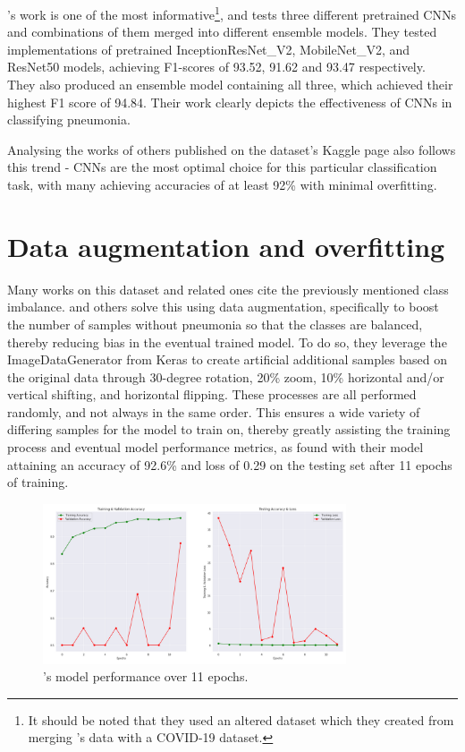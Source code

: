 \documentclass[12pt]{report}
\newcommand{\para}{\vspace{7pt}\noindent}
\begin{document}
\para \textcite{elasnaouiDesignEnsembleDeep2021a}'s work is one of the most informative\footnote{It should be noted that they used an altered dataset which they created from merging \textcite{kermanyIdentifyingMedicalDiagnoses2018}'s data with a COVID-19 dataset.},
and tests three different pretrained CNNs and combinations of them merged into different ensemble models. 
They tested implementations of pretrained InceptionResNet\_V2, MobileNet\_V2, and ResNet50 models, achieving F1-scores of 93.52, 91.62 and 93.47 
respectively. They also produced an ensemble model containing all three, which achieved their highest F1 score of 94.84. Their work clearly 
depicts the effectiveness of CNNs in classifying pneumonia.

\para Analysing the works of others published on the dataset's Kaggle page also follows this trend - CNNs are the most optimal choice for this 
particular classification task, with many achieving accuracies of at least 92\% with minimal overfitting. 

\newpage

\section{Data augmentation and overfitting}\label{sec:Augmentation}
Many works on this dataset and related ones cite the previously mentioned class imbalance.
\textcite{mathurPneumoniaDetectionUsing2020} and others solve this using data augmentation, specifically to boost the number of samples without 
pneumonia so that the classes are balanced, thereby reducing bias in the eventual trained model.
To do so, they leverage the ImageDataGenerator from Keras to create artificial additional samples based on the original data through 
30-degree rotation, 20\% zoom, 10\% horizontal and/or vertical shifting, and horizontal flipping. These processes are all performed randomly,
and not always in the same order. This ensures a wide variety of differing samples for the model to train on, thereby greatly assisting 
the training process and eventual model performance metrics, as \textcite{mathurPneumoniaDetectionUsing2020} found with their model attaining 
an accuracy of 92.6\% and loss of 0.29 on the testing set after 11 epochs of training.

\begin{figure}[H]
    \centering
    \includegraphics[width=0.8\textwidth]{Proposal/MathurModelMetrics.png}
    \caption{\textcite{mathurPneumoniaDetectionUsing2020}'s model performance over 11 epochs.\label{fig:MathurModelMetrics}}
\end{figure}
\end{document}
